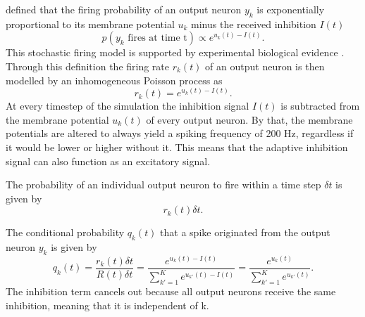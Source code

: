 \citet{nessler} defined that the firing probability of an output neuron  $y_k$ is exponentially proportional to its membrane potential $u_k$ minus the received inhibition $I(t)$
\begin{equation}
\label{eqn:pVonY}
p(y_k \text{ fires at time t}) \propto e^{u_k(t) - I(t)}.
\end{equation}
This stochastic firing model is supported by experimental biological evidence \citep{woDasEHerkommt}. Through this definition the firing rate $r_k(t)$ of an output neuron is then modelled by an inhomogeneous Poisson process as
\begin{equation}
\label{eqn:rk}
r_k(t) = e^{u_k(t) - I(t)}.
\end{equation}
At every timestep of the simulation the inhibition signal $I(t)$ is subtracted from the membrane potential $u_k(t)$ of every output neuron. By that, the membrane potentials are altered to always yield a spiking frequency of 200 Hz, regardless if it would be lower or higher without it. This means that the adaptive inhibition signal can also function as an excitatory signal. 

The probability of an individual output neuron to fire within a time step $\delta t$ is given by
\begin{equation}
\label{eqn:rkdt}
r_k(t) \delta t.
\end{equation}

The conditional probability $q_k(t)$ that a spike originated from the output neuron $y_k$ is given by
\begin{equation}
\label{eqn:qk}
q_k(t) = \frac{r_k(t) \delta t}{R(t) \delta t} = \frac{e^{u_k(t) - I(t)}}{\sum_{k'=1}^K e^{u_{k'}(t) - I(t)}} = \frac{e^{u_k(t)}}{\sum_{k'=1}^K e^{u_{k'}(t)}}.
\end{equation}
The inhibition term cancels out because all output neurons receive the same inhibition, meaning that it is independent of k.

